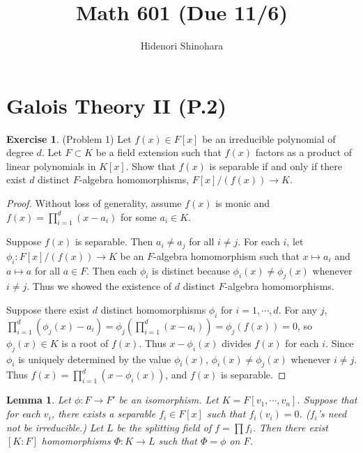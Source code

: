 \documentclass[12pt, psamsfonts]{amsart}
\newtheorem{lem}[thm]{Lemma}
\theoremstyle{definition}
\newtheorem*{exer}{Exercise}
\theoremstyle{remark}
\numberwithin{equation}{section}
\begin{document}
\title{Math 601 (Due 11/6)}
\author{Hidenori Shinohara}
\maketitle

\tableofcontents

\section{Galois Theory II (P.2)}

\begin{exer}{(Problem 1)}
  Let $f(x) \in F[x]$ be an irreducible polynomial of degree $d$.
  Let $F \subset K$ be a field extension such that $f(x)$ factors as a product of linear polynomials in $K[x]$.
  Show that $f(x)$ is separable if and only if there exist $d$ distinct $F$-algebra homomorphisms, $F[x]/(f(x)) \rightarrow K$.
\end{exer}

\begin{proof}
  Without loss of generality, assume $f(x)$ is monic and $f(x) = \prod_{i=1}^{d} (x - a_i)$ for some $a_i \in K$.

  Suppose $f(x)$ is separable.
  Then $a_i \ne a_j$ for all $i \ne j$.
  For each $i$, let $\phi_i: F[x]/(f(x)) \rightarrow K$ be an $F$-algebra homomorphism such that $x \mapsto a_i$ and $a \mapsto a$ for all $a \in F$.
  Then each $\phi_i$ is distinct because $\phi_i(x) \ne \phi_j(x)$ whenever $i \ne j$.
  Thus we showed the existence of $d$ distinct $F$-algebra homomorphisms.

  Suppose there exist $d$ distinct homomorphisms $\phi_i$ for $i = 1, \cdots, d$.
  For any $j$, $\prod_{i=1}^{d}(\phi_j(x) - a_i) = \phi_j(\prod_{i=1}^{d}(x - a_i)) = \phi_j(f(x)) = 0$, so $\phi_j(x) \in K$ is a root of $f(x)$.
  Thus $x - \phi_i(x)$ divides $f(x)$ for each $i$.
  Since $\phi_i$ is uniquely determined by the value $\phi_i(x)$, $\phi_i(x) \ne \phi_j(x)$ whenever $i \ne j$.
  Thus $f(x) = \prod_{i=1}^{d}(x - \phi_i(x))$, and $f(x)$ is separable.
\end{proof}

\begin{lem} \label{difficult_lemma}
  Let $\phi: F \rightarrow F'$ be an isomorphism.
  Let $K = F[v_1, \cdots, v_n]$.
  Suppose that for each $v_i$, there exists a separable $f_i \in F[x]$ such that $f_i(v_i) = 0$.
  ($f_i$'s need not be irreducible.)
  Let $L$ be the splitting field of $f = \prod f_i$.
  Then there exist $[K:F]$ homomorphisms $\Phi: K \rightarrow L$ such that $\Phi = \phi$ on $F$.
\end{lem}
\end{document}
